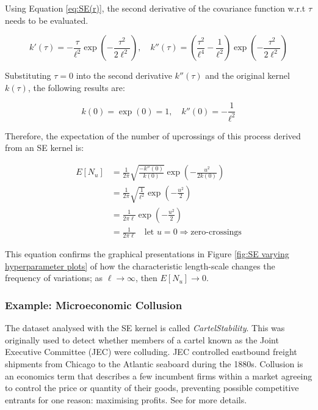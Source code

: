 \documentclass[12pt,a4paper]{article}
\begin{document}
Using Equation \eqref{eq:SE(r)}, the second derivative of the covariance function w.r.t \(\tau\) needs to be evaluated.

\begin{equation*}
k'(\tau) = -\frac{\tau}{\ell^2} \exp\left( -\frac{\tau^2}{2\ell^2} \right), \quad k''(\tau) = \left( \frac{\tau^2}{\ell^4} - \frac{1}{\ell^2} \right) \exp\left( -\frac{\tau^2}{2\ell^2} \right)
\end{equation*}

Substituting \(\tau=0\) into the second derivative \(k''(\tau)\) and the original kernel \(k(\tau)\), the following results are:

\begin{equation*}
k(0) = \exp(0) = 1,  \quad k''(0) = -\frac{1}{\ell^2}
\end{equation*}

Therefore, the expectation of the number of upcrossings of this process derived from an SE kernel is:

\begin{align*}
E[N_u] &= \frac{1}{2\pi} \sqrt{\frac{-k''(0)}{k(0)}} \exp\left(-\frac{u^2}{2k(0)}\right) \\
&= \frac{1}{2\pi} \sqrt{\frac{1}{\ell^2}} \exp\left(-\frac{u^2}{2}\right) \\
&= \frac{1}{2\pi\ell} \exp\left(-\frac{u^2}{2}\right) \\
&= \frac{1}{2\pi\ell} \quad \text{let } u=0 \Rightarrow \text{zero-crossings}  
\end{align*}

This equation confirms the graphical presentations in Figure \ref{fig:SE varying hyperparameter plots} of how the characteristic length-scale changes the frequency of variations; as \(\ell \rightarrow \infty\), then \(E[N_u] \rightarrow 0\).

\subsubsection{Example: Microeconomic Collusion}

The dataset analysed with the SE kernel is called \textit{CartelStability}. This was originally used to detect whether members of a cartel known as the Joint Executive Committee (JEC) were colluding.  JEC controlled eastbound freight shipments from Chicago to the Atlantic seaboard during the 1880s. Collusion is an economics term that describes a few incumbent firms within a market agreeing to control the price or quantity of their goods, preventing possible competitive entrants for one reason: maximising profits. See \citet{Porter1983} for more details. 
\end{document}
